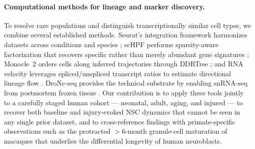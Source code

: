 \paragraph{Computational methods for lineage and marker discovery.}
To resolve rare populations and distinguish transcriptionally similar cell types, we combine several established methods. Seurat's integration framework harmonizes datasets across conditions and species \cite{butler2018integrating}; scHPF performs sparsity-aware factorization that recovers specific rather than merely abundant gene signatures \cite{levitin2019gene}; Monocle~2 orders cells along inferred trajectories through DDRTree \cite{trapnell2014dynamics}; and RNA velocity leverages spliced/unspliced transcript ratios to estimate directional lineage flow \cite{lamanno2018rna}. DroNc-seq provides the technical substrate by enabling snRNA-seq from postmortem frozen tissue \cite{habib2017massively}. Our contribution is to apply these tools jointly to a carefully staged human cohort --- neonatal, adult, aging, and injured --- to recover both baseline and injury-evoked NSC dynamics that cannot be seen in any single prior dataset, and to cross-reference findings with primate-specific observations such as the protracted $>$6-month granule-cell maturation of macaques \cite{kohler2011maturation} that underlies the differential longevity of human neuroblasts.
